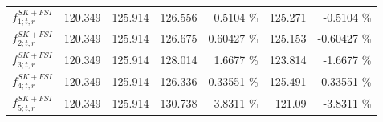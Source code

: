 \begin{table}
\begin{tabular}{| l | r | r | r  r | r  r |}
                                                          $f_{1; t, r}^{SK+FSI}$ &         120.349 & 125.914 & 126.556 &          0.5104 \%  &         125.271 &         -0.5104 \%  \\ 
                                                          $f_{2; t, r}^{SK+FSI}$ &         120.349 & 125.914 & 126.675 &         0.60427 \%  &         125.153 &        -0.60427 \%  \\ 
                                                          $f_{3; t, r}^{SK+FSI}$ &         120.349 & 125.914 & 128.014 &          1.6677 \%  &         123.814 &         -1.6677 \%  \\ 
                                                          $f_{4; t, r}^{SK+FSI}$ &         120.349 & 125.914 & 126.336 &         0.33551 \%  &         125.491 &        -0.33551 \%  \\ 
                                                          $f_{5; t, r}^{SK+FSI}$ &         120.349 & 125.914 & 130.738 &          3.8311 \%  &          121.09 &         -3.8311 \%  \\ 

\end{tabular}
\end{table}
